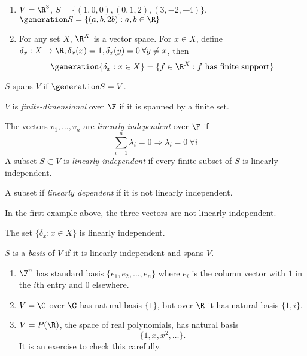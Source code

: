 \documentclass[a4paper]{article}
\newcommand*{\spans}{\generation}
\theoremstyle{definition}
\begin{document}
\begin{eg}\leavevmode
  \begin{enumerate}
 \item $V=\R^3$, $S = \{(1,0,0),(0,1,2),(3,-2,-4)\}$, $\spans S = \{(a,b,2b): a,b\in \R \}$
 \item For any set $X$, $\R^X$ is a vector space. For $x \in X$, define $\delta_x: X \to \R, \delta_x(x) = 1, \delta_x(y) = 0 \: \forall y \neq x$, then
   \[
     \spans{\delta_x: x\in X} = \{f\in \R^X: f \text{ has finite support} \}
   \]
  \end{enumerate} 
\end{eg}

\begin{definition}[Span]
  $S$ spans $V$ if $\spans S = V$.
\end{definition}

\begin{definition}
  $V$ is \emph{finite-dimensional} over $\F$ if it is spanned by a finite set.
\end{definition}

\begin{definition}
  The vectors $v_1,\ldots, v_n$ are \emph{linearly independent} over $\F$ if
  \[
    \sum_{i=1}^n \lambda_i = 0 \Rightarrow \lambda_i = 0 \: \forall i
  \]
  A subset $S \subset V$ is \emph{linearly independent} if every finite subset of $S$ is linearly independent.

  A subset if \emph{linearly dependent} if it is not linearly independent.
\end{definition}

\begin{eg}
  In the first example above, the three vectors are not linearly independent.
\end{eg}

\begin{ex}
  The set $\{\delta_x: x \in X\}$ is linearly independent.
\end{ex}

\begin{definition}[Basis]
  $S$ is a \emph{basis} of $V$ if it is linearly independent and spans $V$.
\end{definition}

\begin{eg}\leavevmode
  \begin{enumerate}
  \item $\F^n$ has standard basis $\{e_1,e_2,\ldots,e_n\}$ where $e_i$ is the column vector with $1$ in the $i$th entry and $0$ elsewhere.
  \item $V=\C$ over $\C$ has natural basis $\{1\}$, but over $\R$ it has natural basis $\{1, i\}$.
  \item $V=P(\R)$, the space of real polynomials, has natural basis
    \[
      \{1, x, x^2, \dots \}.
    \]
    It is an exercise to check this carefully.
    \end{enumerate}
\end{eg}
\end{document}
